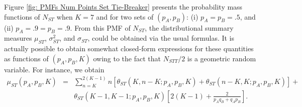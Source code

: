 \documentclass[11pt]{article}
\theoremstyle{plain}
\theoremstyle{definition}
\begin{document}
Figure \ref{fig: PMFs Num Points Set Tie-Breaker} presents the probability mass functions of $N_{ST}$ when $K = 7$ and for two sets of $(p_A,p_B)$: (i) $p_A = p_B = .5$, and (ii) $p_A = .9 = p_B = .9$. From this PMF of $N_{ST}$, the distributional summary measures $\mu_{ST}$, $\sigma_{ST}^2$, and $\sigma_{ST}$, could be obtained via the usual formulas. It is actually possible to obtain somewhat closed-form expressions for these quantities as functions of $(p_A,p_B,K)$ owing to the fact that $N_{STT}/2$ is a geometric random variable. For instance, we obtain
%
\begin{eqnarray*}
 \mu_{ST}(p_A,p_B,K)  & = & \sum_{n=K}^{2(K-1)} n \left[\theta_{ST}(K,n-K;p_A,p_B,K) + \theta_{ST}(n-K,K;p_A,p_B,K) \right] +  \\
    && \theta_{ST}(K-1,K-1;p_A,p_B,K) \left[ 2(K-1) + \frac{2}{p_Aq_B + q_Ap_B}\right].
\end{eqnarray*}
%
\end{document}
